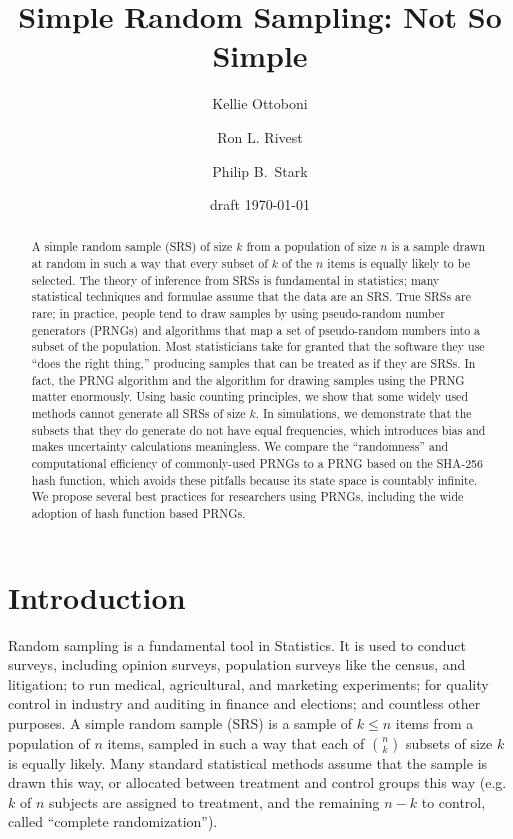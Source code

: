 \documentclass[12pt]{article}
\begin{document}
\title{Simple Random Sampling: Not So Simple}
\author{Kellie Ottoboni
\and
Ron L. Rivest
\and
Philip B.~Stark 
}

\date{draft \today}




\maketitle

\begin{abstract}
\small
A simple random sample (SRS) of size $k$ from a population of size $n$ is a sample drawn 
at random in such a way that every subset of $k$ of the $n$ items is equally likely to be selected. 
The theory of inference from SRSs is fundamental in statistics;
many statistical techniques and formulae assume that the data are an SRS.
True SRSs are rare; in practice, people tend to draw samples by using pseudo-random number generators 
(PRNGs) and algorithms that map a set of pseudo-random numbers into a subset of the population. 
Most statisticians take for granted that the software they use ``does the right thing,''
producing samples that can be treated as if they are SRSs.
In fact, the PRNG algorithm and the algorithm for drawing samples using the PRNG matter
enormously.
Using basic counting principles, we show that some widely used methods cannot generate all SRSs of size $k$.
In simulations, we demonstrate that the subsets that they do generate do not have equal frequencies, which
introduces bias and makes uncertainty calculations meaningless.
We compare the ``randomness'' and computational efficiency of commonly-used PRNGs to a PRNG 
based on the SHA-256 hash function, which avoids these pitfalls because its state space is countably infinite.
We propose several best practices for researchers using PRNGs, including the wide adoption of hash function based PRNGs.
\end{abstract}


\newpage
\tableofcontents
\newpage 

\section{Introduction}
Random sampling is a  fundamental tool in Statistics.
It is used to conduct surveys, including opinion surveys, population surveys like the census, and litigation; 
to run medical, agricultural, and marketing experiments; 
for quality control in industry and auditing in finance and elections;
and countless other purposes.
A simple random sample (SRS) is a sample of $k \leq n$ items from a population of $n$ items,
sampled in such a way that each of ${n \choose k}$ subsets of size $k$ is equally likely.
Many standard statistical methods assume that the sample is drawn this way, 
or allocated between treatment and control groups this way
(e.g. $k$ of $n$ subjects are assigned to treatment, and the remaining $n-k$ to control, 
called ``complete randomization'').
\end{document}

